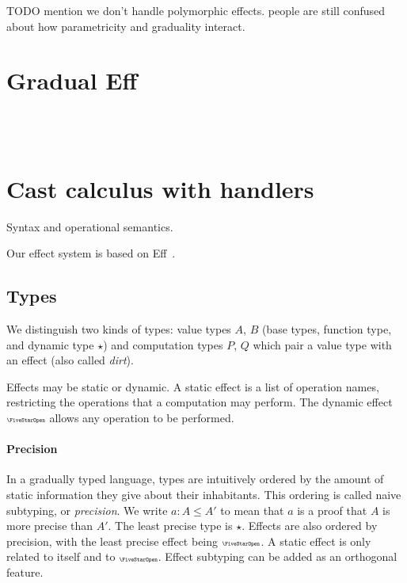 TODO mention we don't handle polymorphic effects.
people are still confused about how parametricity and graduality interact.

\section{Gradual Eff}

\GEmetavars\\[0pt]
\GEgrammar\\[5.0mm]
\GEdefnss

\section{Cast calculus with handlers}

Syntax and operational semantics.

Our effect system is based on Eff~\cite{bauer2015programming}.

\subsection{Types}

We distinguish two kinds of types: value types $A$, $B$ (base types, function type, and
dynamic type $\star$) and computation types $P$, $Q$ which pair a value type with an effect (also called \emph{dirt}).

Effects may be static or dynamic. A static effect is a list of operation names,
restricting the operations that a computation may perform. The dynamic effect $\effany$
allows any operation to be performed.

\paragraph{Precision}
In a gradually typed language, types are intuitively ordered by the amount of
static information they give about their inhabitants. This ordering is called
naive subtyping, or \emph{precision}.
We write $a : A \le A'$ to mean that $a$ is a proof that $A$ is more precise than $A'$.
The least precise type is $\star$.
Effects are also ordered by precision, with the least precise effect being $\effany$.
A static effect is only related to itself and to $\effany$.
Effect subtyping can be added as an orthogonal feature.

